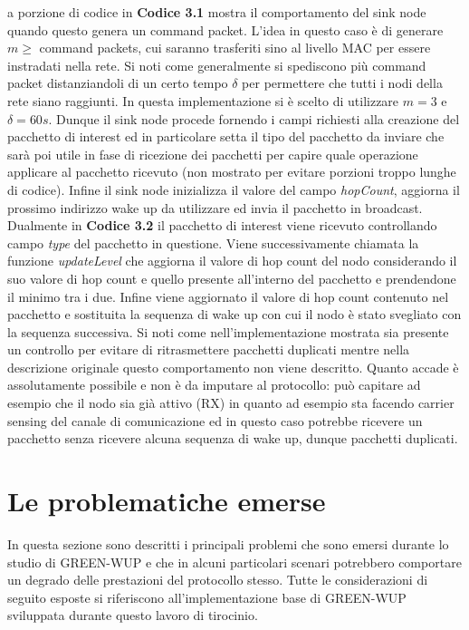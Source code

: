 \documentclass[binding=0.6cm,TFA]{sapthesis}
\begin{document}
\let\cleardoublepage    %

La porzione di codice in \textbf{Codice 3.1} mostra il comportamento del sink node quando questo genera un command packet. L'idea in questo caso è
di generare $m \geq $ command packets, cui saranno trasferiti sino al livello MAC per essere instradati nella rete. Si noti come generalmente si
spediscono più command packet distanziandoli di un certo tempo $\delta$ per permettere che tutti i nodi della rete siano raggiunti. In questa
implementazione si è scelto di utilizzare $m=3$ e $\delta=60s$. Dunque il sink node procede fornendo i campi richiesti alla creazione del
pacchetto di interest ed in particolare setta il tipo del pacchetto da inviare che sarà poi utile in fase di ricezione dei pacchetti
per capire quale operazione applicare al pacchetto ricevuto (non mostrato per evitare porzioni troppo lunghe di codice). Infine il sink
node inizializza il valore del campo \emph{hopCount}, aggiorna il prossimo indirizzo wake up da utilizzare ed invia il pacchetto in broadcast.\\

Dualmente in \textbf{Codice 3.2} il pacchetto di interest viene ricevuto controllando campo \emph{type} del pacchetto in questione. Viene
successivamente chiamata la funzione \emph{updateLevel} che aggiorna il valore di hop count del nodo considerando il suo valore di hop count
e quello presente all'interno del pacchetto e prendendone il minimo tra i due. Infine viene aggiornato il valore di hop count contenuto
nel pacchetto e sostituita la sequenza di wake up con cui il nodo è stato svegliato con la sequenza successiva. Si noti come 
nell'implementazione mostrata sia presente un controllo per evitare di ritrasmettere pacchetti duplicati mentre nella descrizione originale
questo comportamento non viene descritto. Quanto accade è assolutamente possibile e non è da imputare al protocollo: può capitare ad esempio
che il nodo sia già attivo (RX) in quanto ad esempio sta facendo carrier sensing del canale di comunicazione ed in questo caso
potrebbe ricevere un pacchetto senza ricevere alcuna sequenza di wake up, dunque pacchetti duplicati.

\let\cleardoublepage\clearpage  %

\section{Le problematiche emerse}

In questa sezione sono descritti i principali problemi che sono emersi durante lo studio di GREEN-WUP e che in alcuni particolari
scenari potrebbero comportare un degrado delle prestazioni del protocollo stesso. Tutte le considerazioni di seguito esposte si riferiscono
all'implementazione base di GREEN-WUP sviluppata durante questo lavoro di tirocinio.\\
\end{document}
